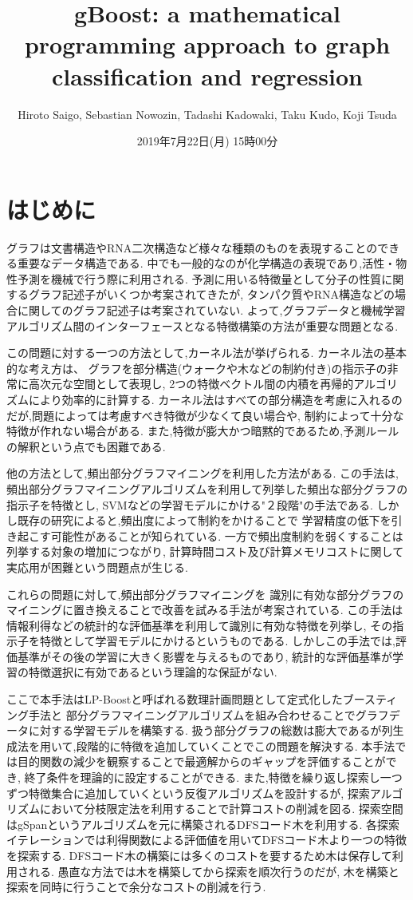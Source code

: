 \documentclass{zasshi-prml3}
\title{gBoost: a mathematical programming approach to graph classification and regression}  %
\date{2019年7月22日(月) 15時00分}      %
\author{Hiroto Saigo, Sebastian Nowozin, Tadashi Kadowaki, Taku Kudo, Koji Tsuda}    %
\theoremstyle{definition}
\begin{document}

\section{はじめに}
グラフは文書構造やRNA二次構造など様々な種類のものを表現することのできる重要なデータ構造である.
中でも一般的なのが化学構造の表現であり,活性・物性予測を機械で行う際に利用される.
予測に用いる特徴量として分子の性質に関するグラフ記述子がいくつか考案されてきたが,
タンパク質やRNA構造などの場合に関してのグラフ記述子は考案されていない.
よって,グラフデータと機械学習アルゴリズム間のインターフェースとなる特徴構築の方法が重要な問題となる.

この問題に対する一つの方法として,カーネル法が挙げられる.
カーネル法の基本的な考え方は、
グラフを部分構造(ウォークや木などの制約付き)の指示子の非常に高次元な空間として表現し,
2つの特徴ベクトル間の内積を再帰的アルゴリズムにより効率的に計算する.
カーネル法はすべての部分構造を考慮に入れるのだが,問題によっては考慮すべき特徴が少なくて良い場合や,
制約によって十分な特徴が作れない場合がある.
また,特徴が膨大かつ暗黙的であるため,予測ルールの解釈という点でも困難である.

他の方法として,頻出部分グラフマイニングを利用した方法がある.
この手法は,頻出部分グラフマイニングアルゴリズムを利用して列挙した頻出な部分グラフの指示子を特徴とし,
SVMなどの学習モデルにかける"２段階"の手法である.
しかし既存の研究によると,頻出度によって制約をかけることで
学習精度の低下を引き起こす可能性があることが知られている.
一方で頻出度制約を弱くすることは列挙する対象の増加につながり,
計算時間コスト及び計算メモリコストに関して実応用が困難という問題点が生じる.

これらの問題に対して,頻出部分グラフマイニングを
識別に有効な部分グラフのマイニングに置き換えることで改善を試みる手法が考案されている.
この手法は情報利得などの統計的な評価基準を利用して識別に有効な特徴を列挙し,
その指示子を特徴として学習モデルにかけるというものである.
しかしこの手法では,評価基準がその後の学習に大きく影響を与えるものであり,
統計的な評価基準が学習の特徴選択に有効であるという理論的な保証がない.

ここで本手法はLP-Boostと呼ばれる数理計画問題として定式化したブースティング手法と
部分グラフマイニングアルゴリズムを組み合わせることでグラフデータに対する学習モデルを構築する.
扱う部分グラフの総数は膨大であるが列生成法を用いて,段階的に特徴を追加していくことでこの問題を解決する.
本手法では目的関数の減少を観察することで最適解からのギャップを評価することができ,
終了条件を理論的に設定することができる.
また,特徴を繰り返し探索し一つずつ特徴集合に追加していくという反復アルゴリズムを設計するが,
探索アルゴリズムにおいて分枝限定法を利用することで計算コストの削減を図る.
探索空間はgSpanというアルゴリズムを元に構築されるDFSコード木を利用する.
各探索イテレーションでは利得関数による評価値を用いてDFSコード木より一つの特徴を探索する.
DFSコード木の構築には多くのコストを要するため木は保存して利用される.
愚直な方法では木を構築してから探索を順次行うのだが,
木を構築と探索を同時に行うことで余分なコストの削減を行う.
\end{document}
